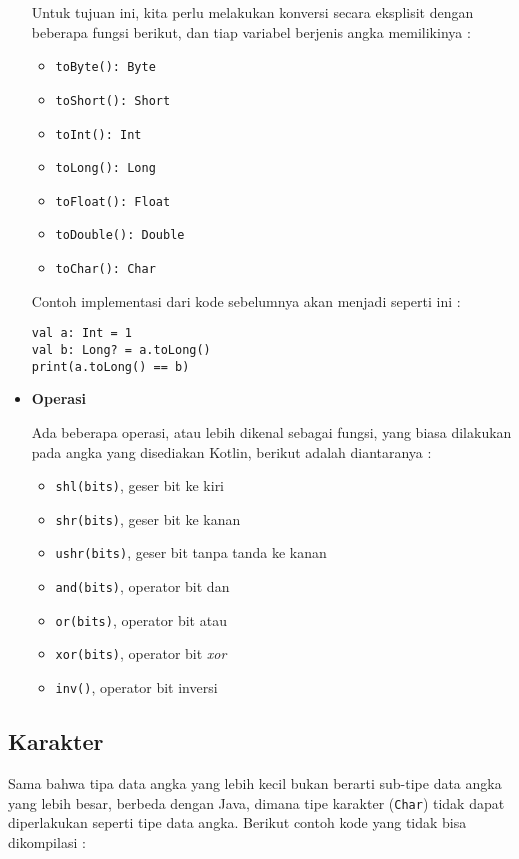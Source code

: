 \begin{itemize}
	Untuk tujuan ini, kita perlu melakukan konversi secara eksplisit dengan beberapa fungsi berikut, dan tiap variabel berjenis angka memilikinya :
	
	\begin{itemize}
		\item \texttt{toByte(): Byte}
		\item \texttt{toShort(): Short}
		\item \texttt{toInt(): Int}
		\item \texttt{toLong(): Long}
		\item \texttt{toFloat(): Float}
		\item \texttt{toDouble(): Double}
		\item \texttt{toChar(): Char}
	\end{itemize}
	
	Contoh implementasi dari kode sebelumnya akan menjadi seperti ini :
	
	\begin{lstlisting}
val a: Int = 1
val b: Long? = a.toLong()
print(a.toLong() == b)
	\end{lstlisting}
	
	\item \textbf{Operasi}
	
		Ada beberapa operasi, atau lebih dikenal sebagai fungsi, yang biasa dilakukan pada angka yang disediakan Kotlin, berikut adalah diantaranya :
		
		\begin{itemize}
			\item \texttt{shl(bits)}, geser bit ke kiri
			\item \texttt{shr(bits)}, geser bit ke kanan
			\item \texttt{ushr(bits)}, geser bit tanpa tanda ke kanan 
			\item \texttt{and(bits)}, operator bit dan
			\item \texttt{or(bits)}, operator bit atau
			\item \texttt{xor(bits)}, operator bit \textit{xor}
			\item \texttt{inv()}, operator bit inversi
		\end{itemize}
	
\end{itemize}

\subsection{Karakter}

Sama bahwa tipa data angka yang lebih kecil bukan berarti sub-tipe data angka yang lebih besar, berbeda dengan Java, dimana tipe karakter (\texttt{Char}) tidak dapat diperlakukan seperti tipe data angka. Berikut contoh kode yang tidak bisa dikompilasi :

